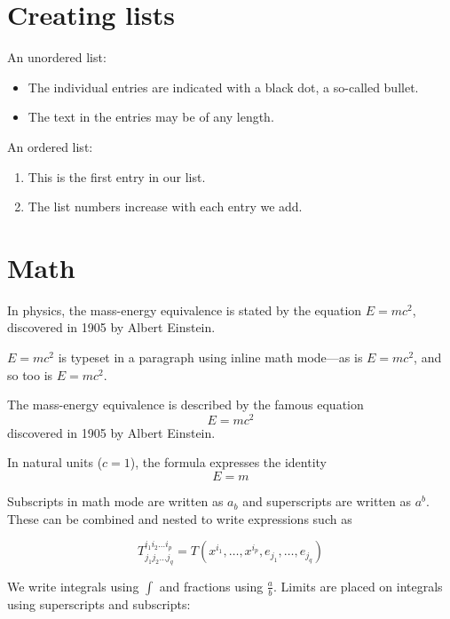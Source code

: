 \documentclass[12pt, letterpaper]{article}
\begin{document}
    \section{Creating lists}\label{sec:creating-lists}

    An unordered list:

    \begin{itemize}
        \item The individual entries are indicated with a black dot, a so-called bullet.
        \item The text in the entries may be of any length.
    \end{itemize}

    \noindent An ordered list:

    \begin{enumerate}
        \item This is the first entry in our list.
        \item The list numbers increase with each entry we add.
    \end{enumerate}


    \section{Math}\label{sec:math}

    In physics, the mass-energy equivalence is stated by the equation $E=mc^2$, discovered in 1905 by Albert Einstein.

    \begin{math}
        E=mc^2
    \end{math} is typeset in a paragraph using inline math mode---as is $E=mc^2$, and so too is \(E=mc^2\).

    The mass-energy equivalence is described by the famous equation\[ E=mc^2 \] discovered in 1905 by Albert Einstein.

    In natural units ($c = 1$), the formula expresses the identity
    \begin{equation}
        E=m
    \end{equation}

    Subscripts in math mode are written as $a_b$ and superscripts are written as $a^b$.
    These can be combined and nested to write expressions such as

    \[ T^{i_1 i_2 \dots i_p}_{j_1 j_2 \dots j_q} = T(x^{i_1},\dots,x^{i_p},e_{j_1},\dots,e_{j_q}) \]

    We write integrals using $\int$ and fractions using $\frac{a}{b}$.
    Limits are placed on integrals using superscripts and subscripts:
\end{document}
